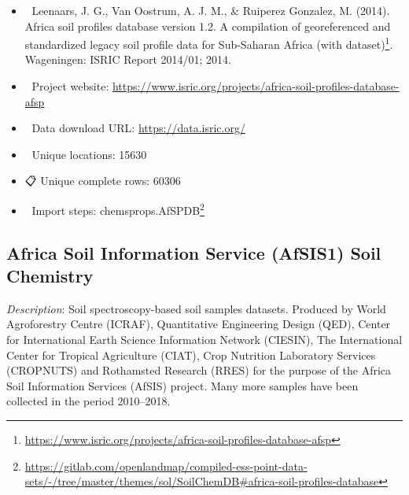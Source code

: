 \documentclass[
  graybox,natbib,nospthms]{svmono}
\providecommand{\tightlist}{%
  \setlength{\itemsep}{0pt}\setlength{\parskip}{0pt}}
\providecommand{\tightlist}{\setlength{\itemsep}{0pt}\setlength{\parskip}{0pt}}
\renewcommand{\href}[2]{#2 (\url{#1})}
\renewcommand{\href}[2]{#2\footnote{\url{#1}}}
\begin{document}
\begin{itemize}
\tightlist
\item
  📕 Leenaars, J. G., Van Oostrum, A. J. M., \& Ruiperez Gonzalez, M. (2014). \href{https://www.isric.org/projects/africa-soil-profiles-database-afsp}{Africa soil profiles database version 1.2. A compilation of georeferenced and standardized legacy soil profile data for Sub-Saharan Africa (with dataset)}. Wageningen: ISRIC Report 2014/01; 2014.\\
\item
  🔗 Project website: \url{https://www.isric.org/projects/africa-soil-profiles-database-afsp}\\
\item
  📂 Data download URL: \url{https://data.isric.org/}\\
\item
  📍 Unique locations: 15630\\
\item
  📋 Unique complete rows: 60306\\
\item
  📝 Import steps: \href{https://gitlab.com/openlandmap/compiled-ess-point-data-sets/-/tree/master/themes/sol/SoilChemDB\#africa-soil-profiles-database}{chemsprops.AfSPDB}
\end{itemize}

\hypertarget{africa-soil-information-service-afsis1-soil-chemistry}{%
\subsection{Africa Soil Information Service (AfSIS1) Soil Chemistry}\label{africa-soil-information-service-afsis1-soil-chemistry}}

\emph{Description}: Soil spectroscopy-based soil samples datasets. Produced by World
Agroforestry Centre (ICRAF), Quantitative Engineering Design (QED), Center for
International Earth Science Information Network (CIESIN), The International Center
for Tropical Agriculture (CIAT), Crop Nutrition Laboratory Services (CROPNUTS) and
Rothamsted Research (RRES) for the purpose of the Africa Soil Information Services (AfSIS) project.
Many more samples have been collected in the period 2010--2018.
\end{document}
